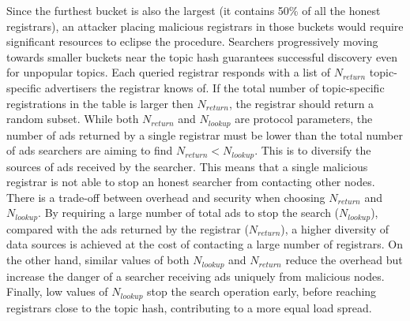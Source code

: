 Since the furthest bucket is also the largest (\ie it contains 50\% of all the honest registrars), an attacker placing malicious registrars in those buckets would require significant resources to eclipse the procedure. 
Searchers progressively moving towards smaller buckets near the topic hash guarantees successful discovery even for unpopular topics.
Each queried registrar responds with a list of $N_\textit{return}$ topic-specific advertisers the registrar knows of. 
If the total number of topic-specific registrations in the table is larger then
$N_\textit{return}$, the registrar should return a random subset.
While both $N_\textit{return}$ and $N_\textit{lookup}$ are protocol parameters,
the number of ads returned by a single registrar must be lower than the total
number of ads searchers are aiming to find $N_\textit{return} <
N_\textit{lookup}$. This is to diversify the sources of ads received by the searcher. This means that a single malicious registrar is not able to stop an honest searcher from contacting other nodes.
There is a trade-off between overhead and security when choosing $N_\textit{return}$ and $N_\textit{lookup}$. 
By requiring a large number of total ads to stop the search
($N_\textit{lookup}$), compared with the ads returned by the registrar
($N_\textit{return}$), a higher diversity of data sources is achieved at the cost of contacting a large number of registrars. On the other hand, similar values of both $N_\textit{lookup}$ and $N_\textit{return}$ reduce the overhead but increase the danger of a searcher receiving ads uniquely from malicious nodes. Finally, low values of $N_\textit{lookup}$ stop the search operation early, before reaching registrars close to the topic hash, contributing to a more equal load spread.

